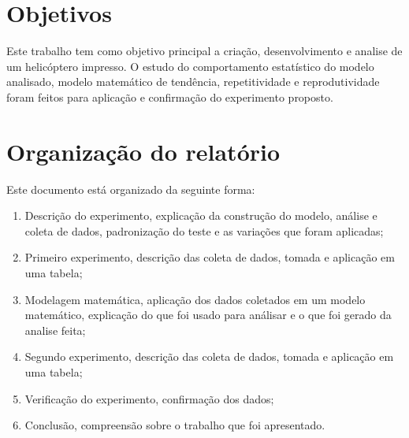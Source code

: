 
\section{Objetivos}
\label{sec:obj}
Este trabalho tem como objetivo principal a criação, desenvolvimento e analise de um helicóptero impresso. O estudo do comportamento estatístico do modelo analisado, modelo matemático de tendência, repetitividade e reprodutividade foram feitos para aplicação e confirmação do experimento proposto.

\section{Organização do relatório}
\label{sec:org}
Este documento está organizado da seguinte forma:
\begin{enumerate}
    \item Descrição do experimento, explicação da construção do modelo, análise e coleta de dados, padronização do teste e as variações que foram aplicadas; 
    \item Primeiro experimento, descrição das coleta de dados, tomada e aplicação em uma tabela;
    \item Modelagem matemática, aplicação dos dados coletados em um modelo matemático, explicação do que foi usado para análisar e o que foi gerado da analise feita;
    \item Segundo experimento, descrição das coleta de dados, tomada e aplicação em uma tabela;
    \item Verificação do experimento, confirmação dos dados;
    \item Conclusão, compreensão sobre o trabalho que foi apresentado.
    
\end{enumerate}